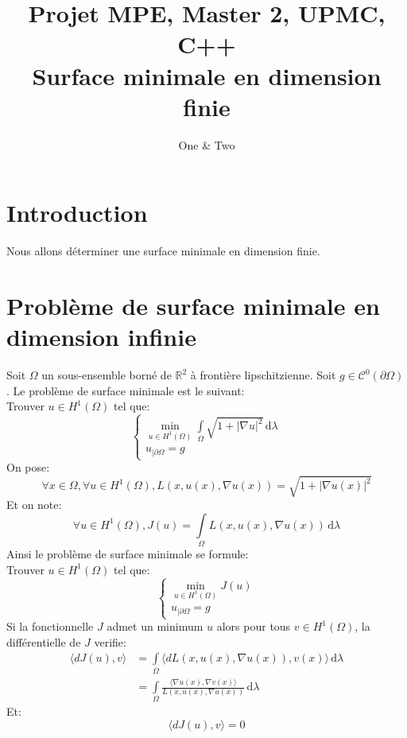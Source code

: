 \documentclass[a4paper, 11pt]{article}
\title{
Projet MPE, Master 2, UPMC, C++ \\
Surface minimale en dimension finie
}
\author{One \& Two}
\begin{document}
\maketitle
\newpage
\protect\hypertarget{table}{}
\renewcommand{\contentsname}{Sommaire}
\tableofcontents
\newpage
\newpage

\section{Introduction}
Nous allons d\'eterminer une surface minimale en dimension finie.

\section{Probl\`eme de surface minimale en dimension infinie}
Soit $\Omega$ un sous-ensemble born\'e de $\mathbb{R}^2$ \`a fronti\`ere
 lipschitzienne. Soit $g\in\mathcal{C}^0(\partial\Omega)$. Le probl\`eme de
 surface minimale est le suivant: \\

Trouver $u\in H^1(\Omega)$ tel que:
\begin{equation}
\begin{cases}
\min\limits_{u\in H^1(\Omega)}\int\limits_\Omega\sqrt{1+|\nabla u|^2}\,
\mathrm{d}\lambda \\
u_{|\partial\Omega}=g
\end{cases}
\end{equation}
On pose:
$$
\forall x\in\Omega, \forall u\in H^1(\Omega), L(x, u(x), \nabla u(x))=
\sqrt{1+|\nabla u(x)|^2}
$$
Et on note:
$$
\forall u\in H^1(\Omega), J(u)=\int\limits_\Omega L(x, u(x), \nabla u(x))
\,\mathrm{d}\lambda
$$
Ainsi le probl\`eme de surface minimale se formule: \\

Trouver $u\in H^1(\Omega)$ tel que:
\begin{equation}
\begin{cases}
\min\limits_{u\in H^1(\Omega)}J(u) \\
u_{|\partial\Omega}=g
\end{cases}
\end{equation}
Si la fonctionnelle $J$ admet un minimum $u$ alors pour tous $v\in H^1(\Omega)$,
 la diff\'erentielle de $J$ verifie:
\begin{align*}
\langle dJ(u), v\rangle &= \int\limits_\Omega\langle dL(x, u(x), \nabla u(x)),
v(x)\rangle\,\mathrm{d}\lambda \\
&= \int\limits_\Omega\frac{\langle \nabla u(x), \nabla v(x)\rangle}{L(x, u(x),
 \nabla u(x))}\,\mathrm{d}\lambda
\end{align*}
Et:
$$
\langle dJ(u), v\rangle = 0
$$
\end{document}

